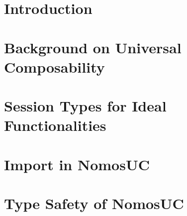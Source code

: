 \documentclass[acmsmall,screen,review,anonymous]{acmart}
\begin{document}
\maketitle



\section{Introduction} \label{sec:intro}


\section{Background on Universal Composability} \label{sec:background}


\section{Session Types for Ideal Functionalities} \label{sec:comexample}


%

%

\section{Import in NomosUC} \label{sec:motivate}


%
%
%

\section{Type Safety of NomosUC} \label{sec:safety}

\end{document}
